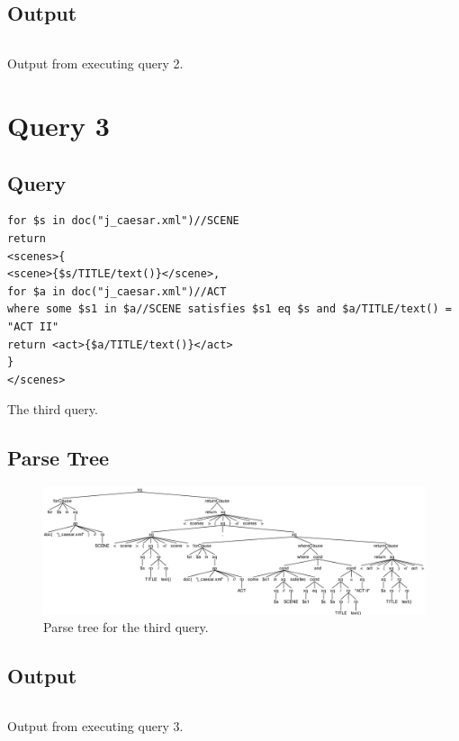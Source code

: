 \documentclass{article}
\begin{document}
\subsection{Output}
\begin{listing}[H]
\inputminted{xml}{src/query2.xml}
\caption{Output from executing query 2.}\label{lst:res2}
\end{listing}

\section{Query 3}
\subsection{Query}

\begin{listing}[H]
\begin{verbatim}
for $s in doc("j_caesar.xml")//SCENE
return
<scenes>{
<scene>{$s/TITLE/text()}</scene>,
for $a in doc("j_caesar.xml")//ACT
where some $s1 in $a//SCENE satisfies $s1 eq $s and $a/TITLE/text() = "ACT II"
return <act>{$a/TITLE/text()}</act>
}
</scenes>
\end{verbatim}
\caption{The third query.}\label{lst:query3}
\end{listing}

\subsection{Parse Tree}
\begin{figure}[H]
  \centering
  \includegraphics[width=\linewidth]{imgs/antlr4_parse_tree_query_3.png}
  \caption{Parse tree for the third query.}\label{fig:parseTree3}
\end{figure}

\subsection{Output}
\begin{listing}[H]
\inputminted{xml}{src/query3.xml}
\caption{Output from executing query 3.}\label{lst:res3}
\end{listing}
\end{document}
